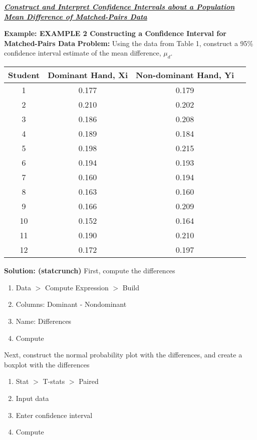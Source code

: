 \documentclass{report}
\begin{document}
    \pagebreak \bigbreak \noindent 
    \textbf{\textit{\underline{Construct and Interpret Confidence Intervals about a Population Mean Difference of Matched-Pairs Data}}}
    \bigbreak \noindent 
    \begin{mdframed}
      \textbf{Example: EXAMPLE 2 Constructing a Confidence Interval for Matched-Pairs Data}
      \bigbreak \noindent 
      \textbf{Problem:}
      Using the data from Table 1, construct a 95\% confidence interval estimate of the mean difference, $\mu_{d}$.
      \bigbreak \noindent 
            \begin{center}
            \begin{tabular}{|c|c|c|c|}
                \hline
                \textbf{Student} & \textbf{Dominant Hand, Xi} & \textbf{Non-dominant Hand, Yi} \\
                \hline
                1 & 0.177 & 0.179 \\
                2 & 0.210 & 0.202 \\
                3 & 0.186 & 0.208 \\
                4 & 0.189 & 0.184 \\
                5 & 0.198 & 0.215 \\
                6 & 0.194 & 0.193 \\
                7 & 0.160 & 0.194 \\
                8 & 0.163 & 0.160 \\
                9 & 0.166 & 0.209 \\
                10 & 0.152 & 0.164 \\
                11 & 0.190 & 0.210 \\
                12 & 0.172 & 0.197 \\
                \hline
            \end{tabular}
        \end{center}
        \bigbreak \noindent 
        \textbf{Solution: (statcrunch)}
        \bigbreak \noindent 
        First, compute the differences
        \begin{enumerate}
            \item Data $> $ Compute Expression $> $ Build
            \item Columns: Dominant - Nondominant
            \item Name: Differences
            \item Compute
        \end{enumerate}
        \bigbreak \noindent 
        Next, construct the normal probability plot with the differences, and create a boxplot with the differences
        \bigbreak \noindent 
        \begin{enumerate}
            \item Stat $> $ T-stats $> $ Paired 
            \item Input data
            \item Enter confidence interval
            \item Compute
        \end{enumerate}

      
    \end{mdframed}
\end{document}
